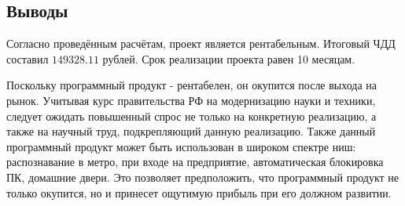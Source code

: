 \subsection*{Выводы}

Согласно проведённым расчётам, проект является рентабельным. Итоговый
ЧДД составил $149328.11$ рублей. Срок реализации проекта равен 10 месяцам.

Поскольку программный продукт - рентабелен, он окупится после выхода на рынок.
Учитывая курс правительства РФ на модернизацию науки и техники, следует
ожидать повышенный спрос не только на конкретную реализацию, а также на
научный труд, подкрепляющий данную реализацию. Также данный программный
продукт может быть использован в широком спектре ниш: распознавание в метро,
при входе на предприятие, автоматическая блокировка ПК, домашние двери.
Это позволяет предположить, что программный продукт не только окупится,
но и принесет ощутимую прибыль при его должном развитии.
\clearpage
